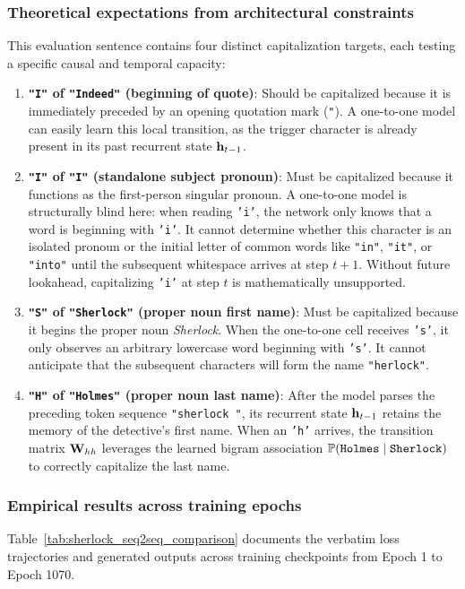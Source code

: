 \documentclass[../../main.tex]{subfiles}
\begin{document}
\subsubsection{Theoretical expectations from architectural constraints}
This evaluation sentence contains four distinct capitalization targets, each testing a specific causal and temporal capacity:
\begin{enumerate}
    \item \textbf{\texttt{"I"} of \texttt{"Indeed"} (beginning of quote)}: Should be capitalized because it is immediately preceded by an opening quotation mark (\texttt{"}). A one-to-one model can easily learn this local transition, as the trigger character is already present in its past recurrent state $\mathbf{h}_{t-1}$.
    \item \textbf{\texttt{"I"} of \texttt{"I"} (standalone subject pronoun)}: Must be capitalized because it functions as the first-person singular pronoun. A one-to-one model is structurally blind here: when reading \texttt{'i'}, the network only knows that a word is beginning with \texttt{'i'}. It cannot determine whether this character is an isolated pronoun or the initial letter of common words like \texttt{"in"}, \texttt{"it"}, or \texttt{"into"} until the subsequent whitespace arrives at step $t+1$. Without future lookahead, capitalizing \texttt{'i'} at step $t$ is mathematically unsupported.
    \item \textbf{\texttt{"S"} of \texttt{"Sherlock"} (proper noun first name)}: Must be capitalized because it begins the proper noun \textit{Sherlock}. When the one-to-one cell receives \texttt{'s'}, it only observes an arbitrary lowercase word beginning with \texttt{'s'}. It cannot anticipate that the subsequent characters will form the name \texttt{"herlock"}.
    \item \textbf{\texttt{"H"} of \texttt{"Holmes"} (proper noun last name)}: After the model parses the preceding token sequence \texttt{"sherlock "}, its recurrent state $\mathbf{h}_{t-1}$ retains the memory of the detective's first name. When an \texttt{'h'} arrives, the transition matrix $\mathbf{W}_{hh}$ leverages the learned bigram association $\mathbb{P}(\text{\texttt{Holmes}} \mid \text{\texttt{Sherlock}})$ to correctly capitalize the last name.
\end{enumerate}

\subsubsection{Empirical results across training epochs}
Table~\ref{tab:sherlock_seq2seq_comparison} documents the verbatim loss trajectories and generated outputs across training checkpoints from Epoch 1 to Epoch 1070.
\end{document}
